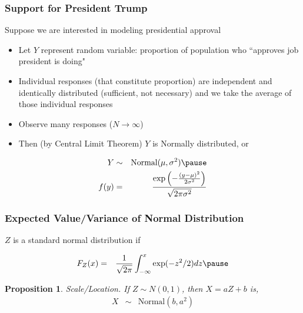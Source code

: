 \documentclass{beamer}
\newtheorem{prop}{Proposition}
\numberwithin{equation}{section}
\begin{document}
\begin{frame}
\frametitle{Support for President Trump} 

Suppose we are interested in modeling \alert{presidential approval} \pause 
\begin{itemize}
\item[-] Let $Y$ represent random variable: proportion of population who ``approves job president is doing" \pause 
\item[-] Individual responses (that constitute proportion) are \alert{independent} and \alert{identically} distributed (sufficient, not necessary) and we take the average of those individual responses \pause 
\item[-] Observe \alert{many} responses ($N\rightarrow \infty$) \pause 
\item[-] Then (by Central Limit Theorem) $Y$ is \alert{Normally} distributed, or  \pause 
\end{itemize}
\begin{eqnarray}
Y& \sim & \text{Normal}(\mu, \sigma^2) \nonumber  \pause \\
f(y) & = & \frac{\exp\left(-\frac{(y-\mu)^2}{2\sigma^2} \right)}{\sqrt{2\pi \sigma^2}} \nonumber 
\end{eqnarray}

\end{frame}



\begin{frame}
\frametitle{Expected Value/Variance of Normal Distribution}

$Z$ is a standard normal distribution if \pause 
{} \pause 



 \pause 
\begin{eqnarray}
F_{Z}(x) & = & \frac{1}{\sqrt{2\pi} }\int_{-\infty}^{x} \exp(-z^2/2) dz \nonumber  \pause 
\end{eqnarray}


\begin{prop} 
\alert{Scale/Location}.  If $Z \sim N(0,1)$, then $X = aZ + b$ is, 
\begin{eqnarray}
X & \sim & \text{Normal} (b, a^2) \nonumber 
\end{eqnarray}
\end{prop}



\end{frame}
\end{document}
